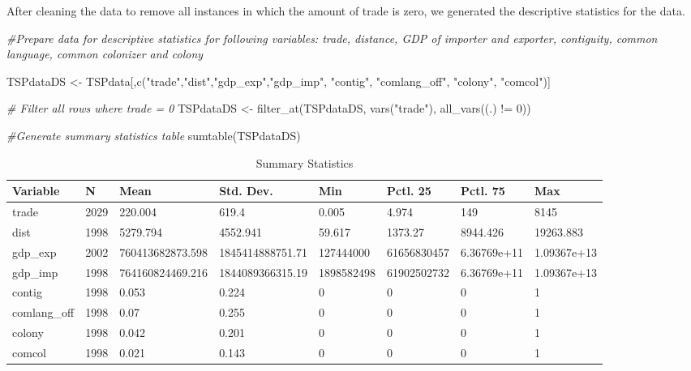 \documentclass[
]{article}
\newenvironment{Shaded}{\begin{snugshade}}{\end{snugshade}}
\newcommand{\CommentTok}[1]{\textcolor[rgb]{0.56,0.35,0.01}{\textit{#1}}}
\newcommand{\DecValTok}[1]{\textcolor[rgb]{0.00,0.00,0.81}{#1}}
\newcommand{\FunctionTok}[1]{\textcolor[rgb]{0.00,0.00,0.00}{#1}}
\newcommand{\NormalTok}[1]{#1}
\newcommand{\OtherTok}[1]{\textcolor[rgb]{0.56,0.35,0.01}{#1}}
\newcommand{\SpecialCharTok}[1]{\textcolor[rgb]{0.00,0.00,0.00}{#1}}
\newcommand{\StringTok}[1]{\textcolor[rgb]{0.31,0.60,0.02}{#1}}
\begin{document}
After cleaning the data to remove all instances in which the amount of
trade is zero, we generated the descriptive statistics for the data.

\begin{Shaded}
\begin{Highlighting}[]
\CommentTok{\#Prepare data for descriptive statistics for following variables: trade,  distance,  GDP  of  importer  and  exporter, contiguity,  common  language,  common  colonizer  and  colony}

\NormalTok{TSPdataDS }\OtherTok{\textless{}{-}}\NormalTok{ TSPdata[,}\FunctionTok{c}\NormalTok{(}\StringTok{"trade"}\NormalTok{,}\StringTok{"dist"}\NormalTok{,}\StringTok{"gdp\_exp"}\NormalTok{,}\StringTok{"gdp\_imp"}\NormalTok{, }\StringTok{"contig"}\NormalTok{, }\StringTok{"comlang\_off"}\NormalTok{, }\StringTok{"colony"}\NormalTok{, }\StringTok{"comcol"}\NormalTok{)]}

\CommentTok{\# Filter all rows where trade = 0 }
\NormalTok{TSPdataDS }\OtherTok{\textless{}{-}} \FunctionTok{filter\_at}\NormalTok{(TSPdataDS, }\FunctionTok{vars}\NormalTok{(}\StringTok{"trade"}\NormalTok{), }\FunctionTok{all\_vars}\NormalTok{((.) }\SpecialCharTok{!=} \DecValTok{0}\NormalTok{))}

\CommentTok{\#Generate summary statistics table}
\FunctionTok{sumtable}\NormalTok{(TSPdataDS)}
\end{Highlighting}
\end{Shaded}

\begin{table}

\caption{\label{tab:sum2}Summary Statistics}
\centering
\begin{tabular}[t]{llllllll}
\toprule
Variable & N & Mean & Std. Dev. & Min & Pctl. 25 & Pctl. 75 & Max\\
\midrule
trade & 2029 & 220.004 & 619.4 & 0.005 & 4.974 & 149 & 8145\\
dist & 1998 & 5279.794 & 4552.941 & 59.617 & 1373.27 & 8944.426 & 19263.883\\
gdp_exp & 2002 & 760413682873.598 & 1845414888751.71 & 127444000 & 61656830457 & 6.36769e+11 & 1.09367e+13\\
gdp_imp & 1998 & 764160824469.216 & 1844089366315.19 & 1898582498 & 61902502732 & 6.36769e+11 & 1.09367e+13\\
contig & 1998 & 0.053 & 0.224 & 0 & 0 & 0 & 1\\
\addlinespace
comlang_off & 1998 & 0.07 & 0.255 & 0 & 0 & 0 & 1\\
colony & 1998 & 0.042 & 0.201 & 0 & 0 & 0 & 1\\
comcol & 1998 & 0.021 & 0.143 & 0 & 0 & 0 & 1\\
\bottomrule
\end{tabular}
\end{table}
\end{document}
